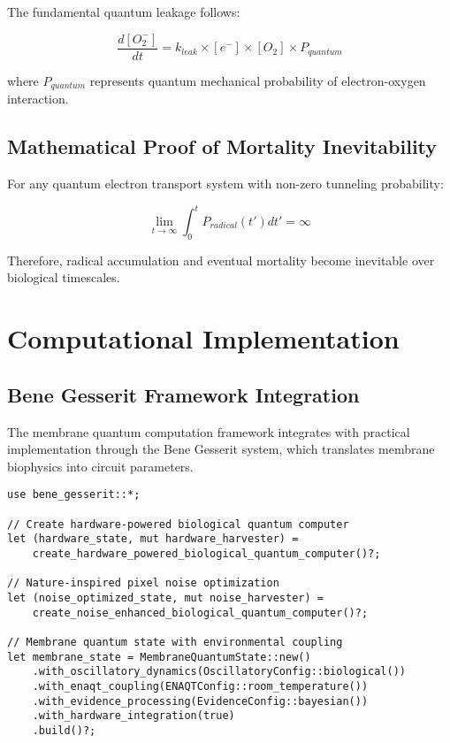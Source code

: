 \documentclass[12pt,a4paper]{article}
\begin{document}
The fundamental quantum leakage follows:

\begin{equation}
\frac{d[O_2^-]}{dt} = k_{leak} \times [e^-] \times [O_2] \times P_{quantum}
\end{equation}

where $P_{quantum}$ represents quantum mechanical probability of electron-oxygen interaction.

\subsection{Mathematical Proof of Mortality Inevitability}

For any quantum electron transport system with non-zero tunneling probability:

\begin{equation}
\lim_{t \rightarrow \infty} \int_0^t P_{radical}(t') dt' = \infty
\end{equation}

Therefore, radical accumulation and eventual mortality become inevitable over biological timescales.

\section{Computational Implementation}

\subsection{Bene Gesserit Framework Integration}

The membrane quantum computation framework integrates with practical implementation through the Bene Gesserit system, which translates membrane biophysics into circuit parameters.

\begin{verbatim}
use bene_gesserit::*;

// Create hardware-powered biological quantum computer
let (hardware_state, mut hardware_harvester) = 
    create_hardware_powered_biological_quantum_computer()?;

// Nature-inspired pixel noise optimization
let (noise_optimized_state, mut noise_harvester) = 
    create_noise_enhanced_biological_quantum_computer()?;

// Membrane quantum state with environmental coupling
let membrane_state = MembraneQuantumState::new()
    .with_oscillatory_dynamics(OscillatoryConfig::biological())
    .with_enaqt_coupling(ENAQTConfig::room_temperature())
    .with_evidence_processing(EvidenceConfig::bayesian())
    .with_hardware_integration(true)
    .build()?;
\end{verbatim}
\end{document}
